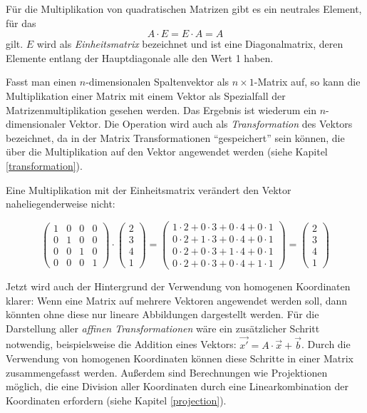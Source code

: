 Für die Multiplikation von quadratischen Matrizen gibt es ein neutrales Element, für das
\begin{equation}
 A \cdot E = E \cdot A = A
\end{equation}
gilt. $E$ wird als \emph{Einheitsmatrix} bezeichnet und ist eine Diagonalmatrix, deren Elemente entlang der Hauptdiagonale alle den Wert 1 haben.

Fasst man einen $n$-dimensionalen Spaltenvektor als $n \times 1$-Matrix auf, so kann die Multiplikation einer Matrix mit einem Vektor als Spezialfall der Matrizenmultiplikation gesehen werden. Das Ergebnis ist wiederum ein $n$-dimensionaler Vektor. Die Operation wird auch als \emph{Transformation} des Vektors bezeichnet, da in der Matrix Transformationen \enquote{gespeichert} sein können, die über die Multiplikation auf den Vektor angewendet werden (siehe Kapitel \ref{transformation}).

Eine Multiplikation mit der Einheitsmatrix verändert den Vektor naheliegenderweise nicht:

\begin{equation}
 \begin{pmatrix}
  1 & 0 & 0 & 0 \\
  0 & 1 & 0 & 0 \\
  0 & 0 & 1 & 0 \\
  0 & 0 & 0 & 1
 \end{pmatrix}
 \cdot
 \begin{pmatrix}
  2 \\
  3 \\
  4 \\
  1
 \end{pmatrix}
 =
 \begin{pmatrix}
  1 \cdot 2 + 0 \cdot 3 + 0 \cdot 4 + 0 \cdot 1 \\
  0 \cdot 2 + 1 \cdot 3 + 0 \cdot 4 + 0 \cdot 1 \\
  0 \cdot 2 + 0 \cdot 3 + 1 \cdot 4 + 0 \cdot 1 \\
  0 \cdot 2 + 0 \cdot 3 + 0 \cdot 4 + 1 \cdot 1
 \end{pmatrix}
 =
 \begin{pmatrix}
  2 \\
  3 \\
  4 \\
  1
 \end{pmatrix}
\end{equation}

Jetzt wird auch der Hintergrund der Verwendung von homogenen Koordinaten klarer: Wenn eine Matrix auf mehrere Vektoren angewendet werden soll, dann könnten ohne diese nur lineare Abbildungen dargestellt werden. Für die Darstellung aller \emph{affinen Transformationen} wäre ein zusätzlicher Schritt notwendig, beispielsweise die Addition eines Vektors: $\vec{x'} = A \cdot \vec{x} + \vec{b}$. Durch die Verwendung von homogenen Koordinaten können diese Schritte in einer Matrix zusammengefasst werden. Außerdem sind Berechnungen wie Projektionen möglich, die eine Division aller Koordinaten durch eine Linearkombination der Koordinaten erfordern (siehe Kapitel \ref{projection}).


